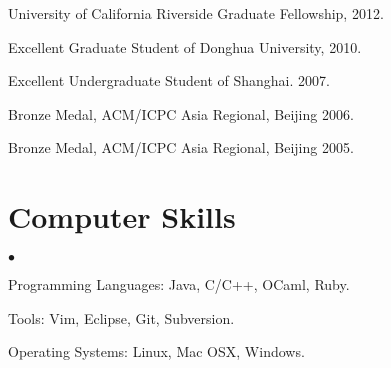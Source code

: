 \documentclass[margin,line]{res}
\newenvironment{list2}{
  \begin{list}{$\bullet$}{%
      \setlength{\itemsep}{0in}
      \setlength{\parsep}{0in} \setlength{\parskip}{0in}
      \setlength{\topsep}{0in} \setlength{\partopsep}{0in} 
      \setlength{\leftmargin}{0.2in}}}{\end{list}}
\begin{document}
\begin{resume}
\vspace*{-2.5mm}
University of California Riverside Graduate Fellowship, 2012.

\vspace*{-2.5mm}
Excellent Graduate Student of Donghua University, 2010.

\vspace*{-2.5mm}
Excellent Undergraduate Student of Shanghai. 2007.

\vspace*{-2.5mm}
Bronze Medal, ACM/ICPC Asia Regional, Beijing 2006.

\vspace*{-2.5mm}
Bronze Medal, ACM/ICPC Asia Regional, Beijing 2005.



\section{\sc Computer Skills} 
\begin{list2}
\item Programming Languages: Java, C/C++, OCaml, Ruby.
\item Tools: Vim, Eclipse, Git, Subversion.
\item Operating Systems: Linux, Mac OSX, Windows.
\end{list2}



\end{resume}
\end{document}
